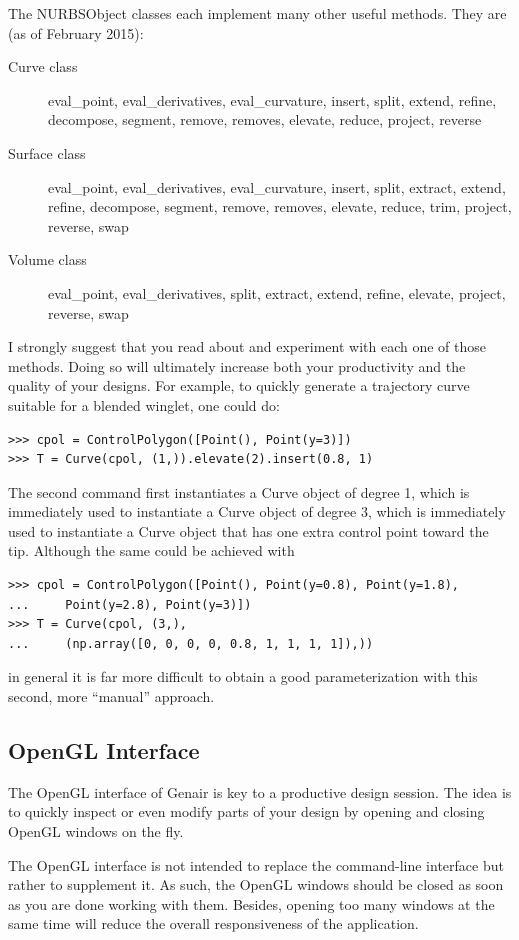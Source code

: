 \documentclass[]{article}
\begin{document}
The NURBSObject classes each implement many other useful methods.  They 
are (as of February 2015):
\begin{description}
\item[Curve class]
eval\_point, eval\_derivatives, eval\_curvature, insert, split, extend, 
refine, decompose, segment, remove, removes, elevate, reduce, project, 
reverse
\item[Surface class]
eval\_point, eval\_derivatives, eval\_curvature, insert, split, extract, 
extend, refine, decompose, segment, remove, removes, elevate, reduce, 
trim, project, reverse, swap
\item[Volume class]
eval\_point, eval\_derivatives, split, extract, extend, refine, elevate, 
project, reverse, swap
\end{description}
I strongly suggest that you read about and experiment with each one of 
those methods.  Doing so will ultimately increase both your productivity 
and the quality of your designs.  For example, to quickly generate a 
trajectory curve suitable for a blended winglet, one could do:
\begin{verbatim}
>>> cpol = ControlPolygon([Point(), Point(y=3)])
>>> T = Curve(cpol, (1,)).elevate(2).insert(0.8, 1)
\end{verbatim}
The second command first instantiates a Curve object of degree 1, which 
is immediately used to instantiate a Curve object of degree 3, which is 
immediately used to instantiate a Curve object that has one extra 
control point toward the tip.  Although the same could be achieved with
\begin{verbatim}
>>> cpol = ControlPolygon([Point(), Point(y=0.8), Point(y=1.8),
...     Point(y=2.8), Point(y=3)])
>>> T = Curve(cpol, (3,),
...     (np.array([0, 0, 0, 0, 0.8, 1, 1, 1, 1]),))
\end{verbatim}
in general it is far more difficult to obtain a good parameterization 
with this second, more ``manual'' approach.

\subsection{OpenGL Interface}
\label{subsec:opengl}

The OpenGL interface of Genair is key to a productive design session.  
The idea is to quickly inspect or even modify parts of your design by 
opening and closing OpenGL windows on the fly.

The OpenGL interface is not intended to replace the command-line 
interface but rather to supplement it.  As such, the OpenGL windows 
should be closed as soon as you are done working with them.  Besides, 
opening too many windows at the same time will reduce the overall 
responsiveness of the application.
\end{document}
